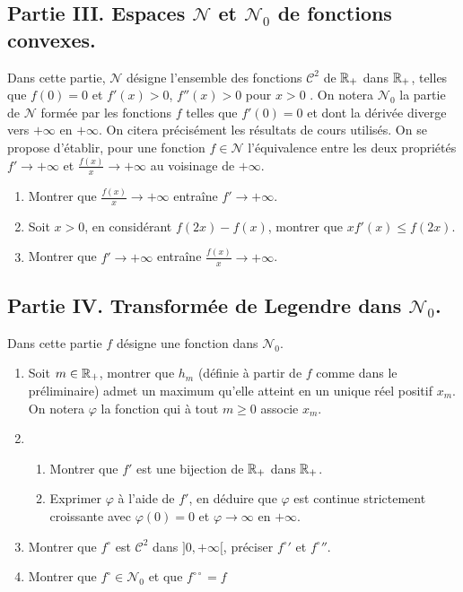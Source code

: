 \subsection*{Partie III. Espaces $\mathcal{N}$ et $\mathcal{N}_0$ de fonctions convexes.}
Dans cette partie, $\mathcal{N}$ désigne l'ensemble des fonctions $\mathcal{C}^2$ de $\mathbb{R}_+$ dans $\mathbb{R}_+$,  telles que $f(0)=0$ et $f'(x)>0$, $f''(x)>0$ pour $x>0$ .\newline
On notera $\mathcal{N}_0$ la partie de $\mathcal{N}$ formée par les fonctions $f$ telles que $f'(0)=0$ et dont la dérivée diverge vers $+\infty$ en $+\infty$.\newline
On citera précisément les résultats de cours utilisés.
On se propose d'établir, pour une fonction $f\in \mathcal{N}$ l'équivalence entre les deux propriétés $f'\rightarrow +\infty$ et $\frac{f(x)}{x}\rightarrow +\infty$ au voisinage de $+\infty$.
\begin{enumerate}
\item Montrer que $\frac{f(x)}{x}\rightarrow +\infty$ entraîne $f'\rightarrow +\infty$.
\item Soit $x>0$, en considérant $f(2x)-f(x)$, montrer que $xf'(x)\leq f(2x)$.
\item Montrer que $f'\rightarrow +\infty$ entraîne $\frac{f(x)}{x}\rightarrow +\infty$.
\end{enumerate}

\subsection*{Partie IV. Transformée de Legendre dans $\mathcal{N}_0$.}
Dans cette partie $f$ désigne une fonction dans $\mathcal{N}_0$.
\begin{enumerate}
\item Soit $m\in \mathbb{R} _+$, montrer que $h_m$ (définie à partir de $f$ comme dans le préliminaire) admet un maximum qu'elle atteint en un unique réel positif $x_m$. On notera $\varphi$ la fonction qui à tout $m\geq 0$ associe $x_m$.
\item \begin{enumerate}
\item Montrer que $f'$ est une bijection de $\mathbb{R} _+$ dans $\mathbb{R} _+$.
\item Exprimer $\varphi$ à l'aide de $f'$, en déduire que $\varphi$ est continue strictement croissante avec $\varphi (0)=0$ et $\varphi \rightarrow \infty$ en $+\infty$.
\end{enumerate}
\item Montrer que $f^\circ$ est $\mathcal{C}^2$ dans $]0,+\infty[$, préciser ${f^{\circ}}'$ et ${f^{\circ}}''$.
\item Montrer que $f^\circ \in \mathcal{N}_0$ et que $f^{\circ\circ}=f$
\end{enumerate}

